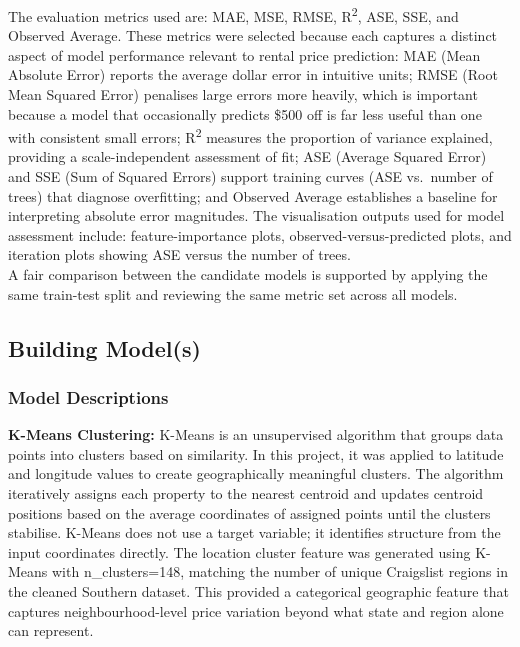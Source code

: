\noindent
The evaluation metrics used are: MAE, MSE, RMSE, R\textsuperscript{2}, ASE, SSE, and Observed Average. These metrics were selected because each captures a distinct aspect of model performance relevant to rental price prediction: MAE (Mean Absolute Error) reports the average dollar error in intuitive units; RMSE (Root Mean Squared Error) penalises large errors more heavily, which is important because a model that occasionally predicts \$500 off is far less useful than one with consistent small errors; R\textsuperscript{2} measures the proportion of variance explained, providing a scale-independent assessment of fit; ASE (Average Squared Error) and SSE (Sum of Squared Errors) support training curves (ASE vs.\ number of trees) that diagnose overfitting; and Observed Average establishes a baseline for interpreting absolute error magnitudes. The visualisation outputs used for model assessment include: feature-importance plots, observed-versus-predicted plots, and iteration plots showing ASE versus the number of trees. \\
\noindent
A fair comparison between the candidate models is supported by applying the same train-test split and reviewing the same metric set across all models.

\subsection{Building Model(s)}

\subsubsection{Model Descriptions}
\label{subsec:Model Descriptions}
\noindent
\textbf{K-Means Clustering:}
K-Means is an unsupervised algorithm that groups data points into clusters based on similarity. In this project, it was applied to latitude and longitude values to create geographically meaningful clusters. The algorithm iteratively assigns each property to the nearest centroid and updates centroid positions based on the average coordinates of assigned points until the clusters stabilise. K-Means does not use a target variable; it identifies structure from the input coordinates directly. The location cluster feature was generated using K-Means with n\_clusters=148, matching the number of unique Craigslist regions in the cleaned Southern dataset. This provided a categorical geographic feature that captures neighbourhood-level price variation beyond what state and region alone can represent.

